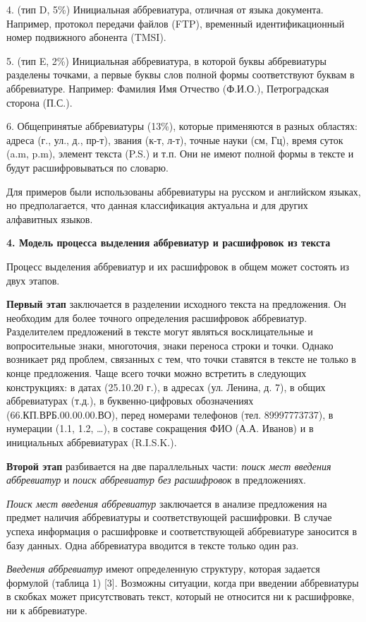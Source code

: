 \documentclass{article}
\begin{document}
4. (тип D, 5\%) Инициальная аббревиатура, отличная от языка
документа. Например, протокол передачи файлов (FTP), временный
идентификационный номер подвижного абонента (TMSI).

5. (тип E, 2\%) Инициальная аббревиатура, в которой буквы
аббревиатуры разделены точками, а первые буквы слов полной
формы соответствуют буквам в аббревиатуре. Например: Фамилия
Имя Отчество (Ф.И.О.), Петроградская сторона (П.С.).

6. Общепринятые аббревиатуры (13\%), которые применяются в
разных областях: адреса (г., ул., д., пр-т), звания (к-т, л-т), точные
науки (см, Гц), время суток (a.m, p.m), элемент текста (P.S.) и т.п. Они
не имеют полной формы в тексте и будут расшифровываться по
словарю.

Для примеров были использованы аббревиатуры на русском и
английском языках, но предполагается, что данная классификация
актуальна и для других алфавитных языков.

\textbf{4. Модель процесса выделения аббревиатур и расшифровок
из текста}

Процесс выделения аббревиатур и их расшифровок в общем
может состоять из двух этапов.

\textbf{Первый этап} заключается в разделении исходного текста на
предложения. Он необходим для более точного определения
расшифровок аббревиатур. Разделителем предложений в тексте могут
являться восклицательные и вопросительные знаки, многоточия,
знаки переноса строки и точки. Однако возникает ряд проблем,
связанных с тем, что точки ставятся в тексте не только в конце
предложения. Чаще всего точки можно встретить в следующих
конструкциях: в датах (25.10.20 г.), в адресах (ул. Ленина, д. 7), в
общих аббревиатурах (т.д.), в буквенно-цифровых обозначениях
(66.КП.ВРБ.00.00.00.ВО), перед номерами телефонов
(тел. 89997773737), в нумерации (1.1, 1.2, …), в составе сокращения
ФИО (А.А. Иванов) и в инициальных аббревиатурах (R.I.S.K.).

\textbf{Второй этап} разбивается на две параллельных части: \textit{поиск
мест введения аббревиатур} и \textit{поиск аббревиатур без расшифровок} в
предложениях.

\textit{Поиск мест введения аббревиатур} заключается в анализе
предложения на предмет наличия аббревиатуры и соответствующей
расшифровки. В случае успеха информация о расшифровке и
соответствующей аббревиатуре заносится в базу данных. Одна
аббревиатура вводится в тексте только один раз.

\textit{Введения аббревиатур} имеют определенную структуру, которая
задается формулой (таблица 1) [3]. Возможны ситуации, когда при
введении аббревиатуры в скобках может присутствовать текст,
который не относится ни к расшифровке, ни к аббревиатуре.
\end{document}
